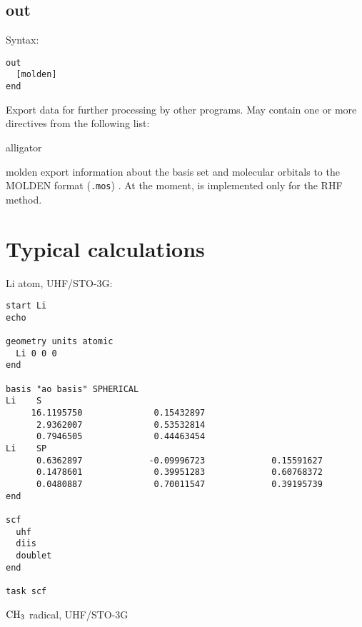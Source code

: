 \documentclass[a4paper, 12pt]{article}
\begin{document}
\subsection{out}

Syntax:

\begin{lstlisting}
out
  [molden]
end
\end{lstlisting}

Export data for further processing by other programs. May contain one or more directives from the following list:

\begin{labeling}{alligator}
\item [molden] export information about the basis set and molecular orbitals to the MOLDEN format (\texttt{.mos}) \cite{molden2000,molden2017,MoldenFormat}. At the moment, is implemented only for the RHF method.
\end{labeling}

\section{Typical calculations}\label{sec:examples}

Li atom, UHF/STO-3G:

\begin{lstlisting}
start Li
echo

geometry units atomic
  Li 0 0 0
end

basis "ao basis" SPHERICAL
Li    S
     16.1195750              0.15432897       
      2.9362007              0.53532814       
      0.7946505              0.44463454       
Li    SP
      0.6362897             -0.09996723             0.15591627       
      0.1478601              0.39951283             0.60768372       
      0.0480887              0.70011547             0.39195739       
end

scf
  uhf
  diis
  doublet
end

task scf
\end{lstlisting}

\bigskip

$\rm CH_3$ radical, UHF/STO-3G
\end{document}
